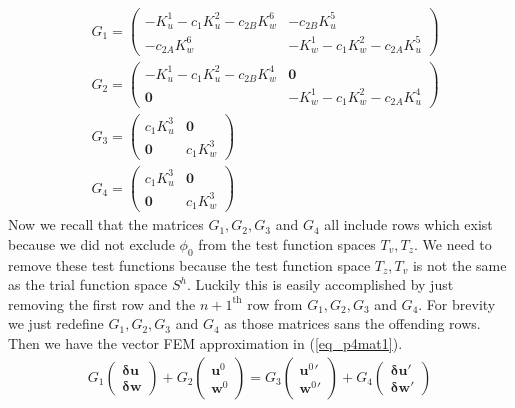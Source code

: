 \documentclass[11pt,fleqn]{article}
\theoremstyle{defstyle}
\begin{document}
\begin{equation}
\begin{aligned}
&G_1 = \begin{pmatrix}
-K^1_u - c_1K^2_u  -c_{2B}K^6_w & -c_{2B}K^5_u \\
-c_{2A}K^6_w & - K^1_w-c_1 K^2_w -c_{2A}K^5_u
\end{pmatrix} \\ 
&G_2 = \begin{pmatrix}
-K^1_u -c_1K^2_u-c_{2B}K^4_w & \mathbf{0} \\
\mathbf{0} & -K^1_w -c_1K^2_w-c_{2A}K^4_u
\end{pmatrix} \\
&G_3 = \begin{pmatrix}
c_1K^3_u & \mathbf{0}\\
\mathbf{0} & c_1K^3_w
\end{pmatrix} \\
&G_4 = \begin{pmatrix}
c_1K^3_u & \mathbf{0} \\
\mathbf{0} & c_1K^3_w
\end{pmatrix}
\end{aligned}
\label{eq_p4mat}
\end{equation}
Now we recall that the matrices $G_1, G_2, G_3$ and $G_4$ all include rows which exist because we did not exclude $\phi_0$ from the test function spaces $T_v,T_z$. We need to remove these test functions because the test function space $T_z,T_v$ is not the same as the trial function space $S^h$. Luckily this is easily accomplished by just removing the first row and the ${n+1}^{\text{th}}$ row from $G_1, G_2, G_3$ and $G_4$. For brevity we just redefine $G_1, G_2, G_3$ and $G_4$ as those matrices sans the offending rows. Then we have the vector FEM approximation in (\ref{eq_p4mat1}).
\begin{equation}
\begin{aligned}
G_1 \begin{pmatrix}
\mathbf{\delta u} \\ \mathbf{\delta w} 
\end{pmatrix} + G_2 \begin{pmatrix}
\mathbf{u}^0 \\ \mathbf{w}^0 
\end{pmatrix}
= G_3 \begin{pmatrix}
\mathbf{u}^0\prime \\ \mathbf{w}^0\prime 
\end{pmatrix} + G_4 \begin{pmatrix}
\mathbf{\delta u}\prime \\ \mathbf{\delta w}\prime 
\end{pmatrix}
\end{aligned}
\label{eq_p4mat1}
\end{equation}
\end{document}
